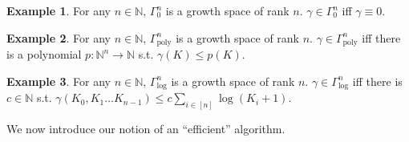 \documentclass{article}
\numberwithin{equation}{section}
\theoremstyle{definition}
\newtheorem{example}{Example}[section]
\theoremstyle{plain}
\newcommand{\Nats}{\mathbb{N}}
\begin{document}
\begin{example}

For any $n \in \Nats$, $\Gamma_0^n$ is a growth space of rank $n$. $\gamma \in \Gamma_0^n$ iff $\gamma \equiv 0$.

\end{example}

\begin{example}

For any $n \in \Nats$, $\Gamma_{\text{poly}}^n$ is a growth space of rank $n$. $\gamma \in \Gamma_{\text{poly}}^n$ iff there is a polynomial $p: \Nats^n \rightarrow \Nats$ s.t. $\gamma(K) \leq p(K)$.

\end{example}

\begin{example}

For any $n \in \Nats$, $\Gamma_{\text{log}}^n$ is a growth space of rank $n$. $\gamma \in \Gamma_{\text{log}}^n$ iff there is $c \in \Nats$ s.t. $\gamma(K_0, K_1 \ldots K_{n-1}) \leq c \sum_{i \in [n]} \log(K_i+1)$.

\end{example}

We now introduce our notion of an \enquote{efficient} algorithm.
\end{document}
